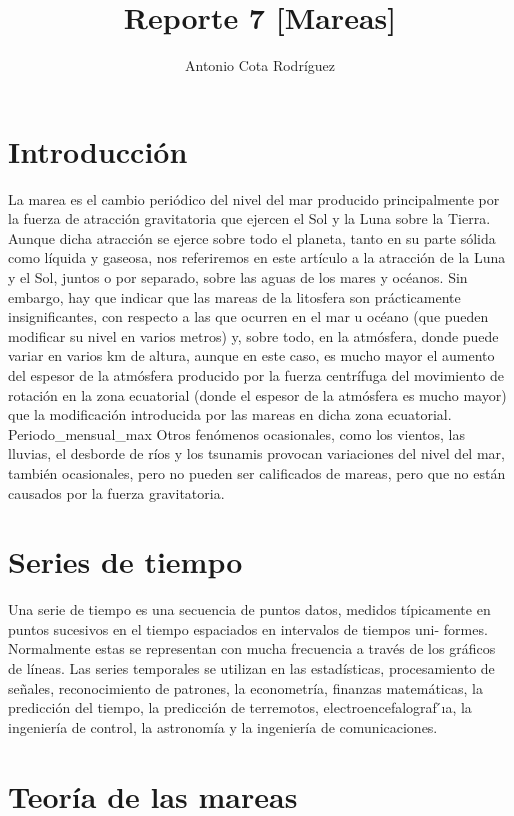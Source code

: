 \documentclass[]{article}
\title{Reporte 7 [Mareas]}
\author{Antonio Cota Rodr\'iguez}
\date{}
\begin{document}
\maketitle

\section*{Introducci\'on}
La marea es el cambio periódico del nivel del mar producido principalmente por la fuerza de atracción gravitatoria que ejercen el Sol y la Luna sobre la Tierra. Aunque dicha atracción se ejerce sobre todo el planeta, tanto en su parte sólida como líquida y gaseosa, nos referiremos en este artículo a la atracción de la Luna y el Sol, juntos o por separado, sobre las aguas de los mares y océanos. Sin embargo, hay que indicar que las mareas de la litosfera son prácticamente insignificantes, con respecto a las que ocurren en el mar u océano (que pueden modificar su nivel en varios metros) y, sobre todo, en la atmósfera, donde puede variar en varios km de altura, aunque en este caso, es mucho mayor el aumento del espesor de la atmósfera producido por la fuerza centrífuga del movimiento de rotación en la zona ecuatorial (donde el espesor de la atmósfera es mucho mayor) que la modificación introducida por las mareas en dicha zona ecuatorial.
Periodo_mensual_max
Otros fenómenos ocasionales, como los vientos, las lluvias, el desborde de ríos y los tsunamis provocan variaciones del nivel del mar, también ocasionales, pero no pueden ser calificados de mareas, pero que no están causados por la fuerza gravitatoria.

\section*{Series de tiempo}
Una serie de tiempo es una secuencia de puntos datos, medidos t\'ipicamente
en puntos sucesivos en el tiempo espaciados en intervalos de tiempos uni-
formes. Normalmente estas se representan con mucha frecuencia a trav\'es de
los gr\'aficos de l\'ineas. Las series temporales se utilizan en las estad\'isticas, procesamiento de señales, reconocimiento de patrones, la econometr\'ia, finanzas matem\'aticas, la predicci\'on del tiempo, la predicci\'on de terremotos, electroencefalograf ́ıa, la ingenier\'ia de control, la astronom\'ia y la ingenier\'ia
de comunicaciones.


\section*{Teor\'ia de las mareas}
\end{document}
